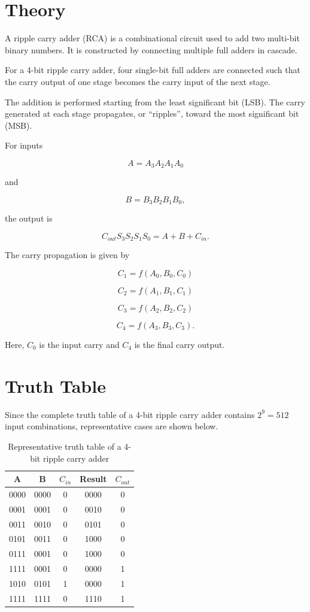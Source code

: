 \documentclass[12pt,a4paper]{report}
\begin{document}
\section{Theory}

A ripple carry adder (RCA) is a combinational circuit used to add two multi-bit binary numbers. It is constructed by connecting multiple full adders in cascade.

For a 4-bit ripple carry adder, four single-bit full adders are connected such that the carry output of one stage becomes the carry input of the next stage.

The addition is performed starting from the least significant bit (LSB). The carry generated at each stage propagates, or ``ripples'', toward the most significant bit (MSB).

For inputs

\[
A=A_3A_2A_1A_0
\]

and

\[
B=B_3B_2B_1B_0,
\]

the output is

\[
C_{out}S_3S_2S_1S_0=A+B+C_{in}.
\]

The carry propagation is given by

\[
C_1=f(A_0,B_0,C_0)
\]

\[
C_2=f(A_1,B_1,C_1)
\]

\[
C_3=f(A_2,B_2,C_2)
\]

\[
C_4=f(A_3,B_3,C_3).
\]

Here, $C_0$ is the input carry and $C_4$ is the final carry output.

\section{Truth Table}

Since the complete truth table of a 4-bit ripple carry adder contains $2^9=512$ input combinations, representative cases are shown below.

\begin{table}[H]
    \centering
    \begin{tabular}{|c|c|c|c|c|}
        \hline
        \textbf{A} & \textbf{B} & \textbf{$C_{in}$} & \textbf{Result} & \textbf{$C_{out}$} \\
        \hline
        0000 & 0000 & 0 & 0000 & 0 \\
        \hline
        0001 & 0001 & 0 & 0010 & 0 \\
        \hline
        0011 & 0010 & 0 & 0101 & 0 \\
        \hline
        0101 & 0011 & 0 & 1000 & 0 \\
        \hline
        0111 & 0001 & 0 & 1000 & 0 \\
        \hline
        1111 & 0001 & 0 & 0000 & 1 \\
        \hline
        1010 & 0101 & 1 & 0000 & 1 \\
        \hline
        1111 & 1111 & 0 & 1110 & 1 \\
        \hline
    \end{tabular}
    \caption{Representative truth table of a 4-bit ripple carry adder}
    \label{tab:ripple_carry_adder}
\end{table}
\end{document}
